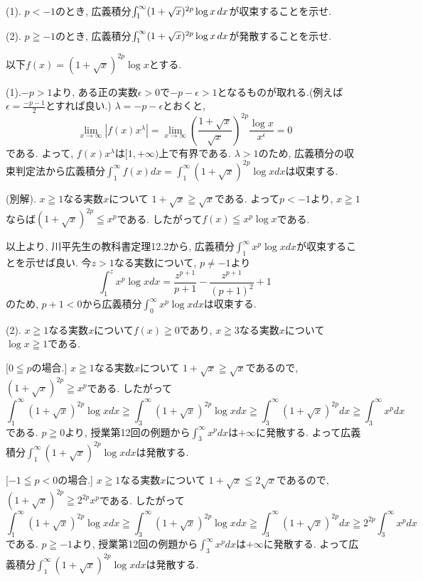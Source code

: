 \documentclass[dvipdfmx,a4paper,11pt]{article}
\theoremstyle{definition}
\begin{document}
{\large(1). $p<-1$のとき, 広義積分$\int_{1}^{\infty} (1+\sqrt{x})^{2p} \log x \text{\,}dx$が収束することを示せ.}

\vspace{11pt}

{\large(2). $p \geqq -1$のとき, 広義積分$\int_{1}^{\infty} (1+\sqrt{x})^{2p} \log x \text{\,}dx$が発散することを示せ.}

 \vspace{11pt}
 
\hspace{-11pt}{\Large $\bullet$ 第6問解答例}

以下$f(x)=(1+\sqrt{x})^{2p} \log x$とする.

(1).$-p > 1$より, ある正の実数$\epsilon >0$で$-p-\epsilon >1$となるものが取れる.(例えば$\epsilon = \frac{-p-1}{2}$とすれば良い.)
$\lambda = -p-\epsilon$とおくと, 
$$
\lim_{x \rightarrow \infty} |f(x) x^{\lambda}| = 
\lim_{x \rightarrow \infty} \left( \frac{1+ \sqrt{x}}{\sqrt{x}} \right)^{2p} \frac{\log x}{x^{\epsilon}} =0$$
である.
よって, $f(x)x^{\lambda}$は$[1,+\infty)$上で有界である.
$\lambda>1$のため, 広義積分の収束判定法から広義積分$\int_{1}^{\infty} f(x)dx=\int_{1}^{\infty} (1+\sqrt{x})^{2p} \log xdx$は収束する.

(別解). $x \geqq 1$なる実数$x$について
$1+ \sqrt{x} \geqq \sqrt{x}$である. よって$p<-1$より, $x \geqq 1$ならば$(1+ \sqrt{x} )^{2p }\leqq x^p$である.
したがって$f(x) \leqq  x^p \log x $である.

以上より, 川平先生の教科書定理12.2から, 広義積分$\int_{1}^{\infty} x^p \log x dx$が収束することを示せば良い.
今$z>1$なる実数について, $p \neq -1$より
$$
\int_{1}^{z} x^p \log x dx =
\frac{z^{p+1}}{p+1} - \frac{z^{p+1}}{(p+1)^2} +1
$$
のため, $p+1<0$から広義積分$\int_{0}^{\infty} x^p \log x dx$は収束する.

(2). $x \geqq 1$なる実数$x$について$f(x) \geqq 0$であり, 
$x \geqq 3$なる実数$x$について$\log x \geqq 1$である.

 [$0 \leqq p$の場合.]
 $x \geqq 1$なる実数$x$について
 $1+ \sqrt{x} \geqq \sqrt{x}$であるので, $(1+ \sqrt{x} )^{2p } \geqq x^p$である.
 したがって
$$
\int_{1}^{\infty} (1+ \sqrt{x} )^{2p } \log xdx
\geqq
\int_{3}^{\infty} (1+ \sqrt{x} )^{2p } \log xdx
\geqq
\int_{3}^{\infty} (1+ \sqrt{x} )^{2p } dx
\geqq
\int_{3}^{\infty} x^p dx
$$
 である. $p \geqq 0$より, 授業第12回の例題から$\int_{3}^{\infty} x^p dx$は$+\infty$に発散する.
 よって広義積分$\int_{1}^{\infty} (1+\sqrt{x})^{2p} \log xdx$は発散する.
 
  [$-1\leqq p <0$の場合.]
 $x \geqq 1$なる実数$x$について
 $1+ \sqrt{x} \leqq 2\sqrt{x}$であるので, $(1+ \sqrt{x} )^{2p } \geqq 2^{2p} x^p$である.
 したがって
$$
\int_{1}^{\infty} (1+ \sqrt{x} )^{2p } \log xdx
\geqq
\int_{3}^{\infty} (1+ \sqrt{x} )^{2p } \log xdx
\geqq
\int_{3}^{\infty} (1+ \sqrt{x} )^{2p } dx
\geqq
2^{2p}\int_{3}^{\infty} x^p dx
$$
 である. $p \geqq -1$より, 授業第12回の例題から$\int_{3}^{\infty} x^p dx$は$+\infty$に発散する.
 よって広義積分$\int_{1}^{\infty} (1+\sqrt{x})^{2p} \log xdx$は発散する.
 
\end{document}

